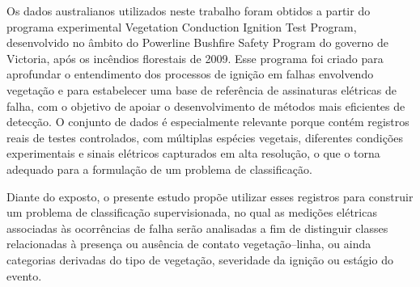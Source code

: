 Os dados australianos utilizados neste trabalho \cite{vic_bushfire_report} foram obtidos a partir do programa experimental Vegetation Conduction Ignition Test Program, desenvolvido no âmbito do Powerline Bushfire Safety Program do governo de Victoria, após os incêndios florestais de 2009. Esse programa foi criado para aprofundar o entendimento dos processos de ignição em falhas envolvendo vegetação e para estabelecer uma base de referência de assinaturas elétricas de falha, com o objetivo de apoiar o desenvolvimento de métodos mais eficientes de detecção. O conjunto de dados é especialmente relevante porque contém registros reais de testes controlados, com múltiplas espécies vegetais, diferentes condições experimentais e sinais elétricos capturados em alta resolução, o que o torna adequado para a formulação de um problema de classificação.

Diante do exposto, o presente estudo propõe utilizar esses registros para construir um problema de classificação supervisionada, no qual as medições elétricas associadas às ocorrências de falha serão analisadas a fim de distinguir classes relacionadas à presença ou ausência de contato vegetação–linha, ou ainda categorias derivadas do tipo de vegetação, severidade da ignição ou estágio do evento.